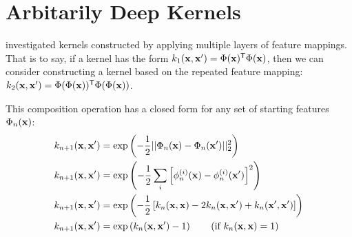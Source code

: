 \documentclass{article}
\begin{document}
\section{Arbitarily Deep Kernels}
\label{sec:deep_kernels}

\cite{cho2012kernel} investigated kernels constructed by applying multiple layers of feature mappings.  That is to say, if a kernel has the form $k_1({\bf{x}}, {\bf{x}}') = \Phi({\bf{x}}) {^\mathsf{T}} \Phi({\bf{x}})$, then we can consider constructing a kernel based on the repeated feature mapping: $k_2({\bf{x}}, {\bf{x}}') = \Phi(\Phi({\bf{x}})) {^\mathsf{T}} \Phi(\Phi({\bf{x}}))$.
%

This composition operation has a closed form for any set of starting features $\Phi_n({\bf{x}})$:
%
%
%
%
%
\begin{align}
k_{n+1}({\bf{x}}, {\bf{x}}') & = \exp \left( -\frac{1}{2} || \Phi_n({\bf{x}}) - \Phi_n({\bf{x}}')||_2^2 \right) \\
k_{n+1}({\bf{x}}, {\bf{x}}') & = \exp \left( -\frac{1}{2} \sum_i \left[ \phi_n^{(i)}({\bf{x}}) - \phi_n^{(i)}({\bf{x}}') \right]^2 \right) \\
k_{n+1}({\bf{x}}, {\bf{x}}') & = \exp \left( -\frac{1}{2} \left[ k_n({\bf{x}}, {\bf{x}}) - 2 k_n({\bf{x}}, {\bf{x}}') + k_n({\bf{x}}', {\bf{x}}') \right] \right)\\
k_{n+1}({\bf{x}}, {\bf{x}}') & = \exp \left( k_n({\bf{x}}, {\bf{x}}') - 1 \right) \qquad \textnormal{(if $k_n({\bf{x}}, {\bf{x}}) = 1$)}
\end{align}
%
\end{document}
